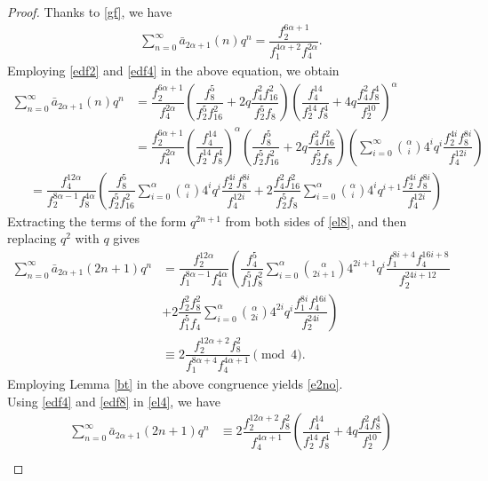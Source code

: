 \documentclass[11pt,a4paper]{article}
\numberwithin{equation}{section}
\theoremstyle{plain}
\begin{document}
	\begin{proof}
	Thanks to \eqref{gf}, we have
	\begin{align*}
	\sum_{n=0}^{\infty}\bar{a}_{2\alpha+1}(n)q^n=\dfrac{f_2^{6\alpha+1}}{f_1^{4\alpha+2}f_4^{2\alpha}}.
	\end{align*}
	Employing \eqref{edf2} and \eqref{edf4} in the above equation, we obtain
	\begin{align}
		\sum_{n=0}^{\infty}\bar{a}_{2\alpha+1}(n)q^n&=\dfrac{f_2^{6\alpha+1}}{f_4^{2\alpha}}\left(\dfrac{f_8^5}{f_2^5f_{16}^2}+2q\dfrac{f_4^2f_{16}^2}{f_2^5f_8}\right)\left(\dfrac{f_4^{14}}{f_2^{14}f_8^4}+4q\dfrac{f_4^2f_8^4}{f_2^{10}}\right)^\alpha\nonumber\\
		&=\dfrac{f_2^{6\alpha+1}}{f_4^{2\alpha}}\left(\dfrac{f_4^{14}}{f_2^{14}f_8^4}\right)^\alpha\left(\dfrac{f_8^5}{f_2^5f_{16}^2}+2q\dfrac{f_4^2f_{16}^2}{f_2^5f_8}\right)\left(\sum_{i=0}^{\infty}\binom{\alpha}{i}4^iq^i\dfrac{f_2^{4i}f_8^{8i}}{f_4^{12i}}\right)\nonumber
	\end{align}
	\begin{align}
		&=\dfrac{f_4^{12\alpha}}{f_2^{8\alpha-1}f_8^{4\alpha}}\left(\dfrac{f_8^5}{f_2^5f_{16}^2}\sum_{i=0}^{\alpha}\binom{\alpha}{i}4^iq^i\dfrac{f_2^{4i}f_8^{8i}}{f_4^{12i}}+2\dfrac{f_4^2f_{16}^2}{f_2^5f_8}\sum_{i=0}^{\alpha}\binom{\alpha}{i}4^iq^{i+1}\dfrac{f_2^{4i}f_8^{8i}}{f_4^{12i}}\right)\label{el8}
	\end{align}
		Extracting the terms of the form $q^{2n+1}$ from both sides of \eqref{el8}, and then replacing $q^{2}$ with $q$ gives
	\begin{align}
	\sum_{n=0}^{\infty}\bar{a}_{2\alpha+1}(2n+1)q^n&=\dfrac{f_2^{12\alpha}}{f_1^{8\alpha-1}f_4^{4\alpha}}\left(\dfrac{f_4^5}{f_1^5f_{8}^2}\sum_{i=0}^{\alpha}\binom{\alpha}{2i+1}4^{2i+1}q^i\dfrac{f_1^{8i+4}f_4^{16i+8}}{f_2^{24i+12}}\right.\nonumber\\
	&\left.+2\dfrac{f_2^2f_{8}^2}{f_1^5f_4}\sum_{i=0}^{\alpha}\binom{\alpha}{2i}4^{2i}q^{i}\dfrac{f_1^{8i}f_4^{16i}}{f_2^{24i}}\right)\nonumber\\
	&\equiv 2\dfrac{f_2^{12\alpha+2}f_8^2}{f_1^{8\alpha+4}f_4^{4\alpha+1}}\pmod 4.\label{el4}
	\end{align}
	Employing Lemma \ref{bt} in the above congruence yields \eqref{e2no}.\\
\indent	Using \eqref{edf4} and \eqref{edf8} in \eqref{el4}, we have
\begin{align}
\sum_{n=0}^{\infty}\bar{a}_{2\alpha+1}(2n+1)q^n&\equiv 2\dfrac{f_2^{12\alpha+2}f_8^2}{f_4^{4\alpha+1}}\left(\dfrac{f_4^{14}}{f_2^{14}f_8^4}+4q\dfrac{f_4^2f_8^4}{f_2^{10}}\right)\nonumber\\

\end{align}
\end{proof}
\end{document}
